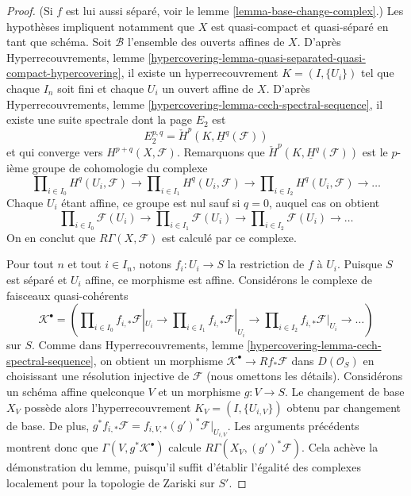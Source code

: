 \begin{proof}
(Si $f$ est lui aussi séparé, voir le
lemme \ref{lemma-base-change-complex}.)
Les hypothèses impliquent notamment que $X$
est quasi-compact et quasi-séparé en tant que schéma.
Soit $\mathcal{B}$ l'ensemble des ouverts affines de $X$. D'après
Hyperrecouvrements,
lemme \ref{hypercovering-lemma-quasi-separated-quasi-compact-hypercovering},
il existe un hyperrecouvrement $K = (I, \{U_i\})$ tel que chaque
$I_n$ soit fini et chaque $U_i$ un ouvert affine de $X$. D'après
Hyperrecouvrements, lemme \ref{hypercovering-lemma-cech-spectral-sequence},
il existe une suite spectrale dont la page $E_2$ est
$$
E_2^{p, q} = \check{H}^p(K, \underline{H}^q(\mathcal{F}))
$$
et qui converge vers $H^{p + q}(X, \mathcal{F})$. Remarquons que
$\check{H}^p(K, \underline{H}^q(\mathcal{F}))$ est le $p$-ième groupe
de cohomologie du complexe
$$
\prod\nolimits_{i \in I_0} H^q(U_i, \mathcal{F})
\to
\prod\nolimits_{i \in I_1} H^q(U_i, \mathcal{F})
\to
\prod\nolimits_{i \in I_2} H^q(U_i, \mathcal{F})
\to \ldots
$$
Chaque $U_i$ étant affine, ce groupe est nul sauf si $q = 0$,
auquel cas on obtient
$$
\prod\nolimits_{i \in I_0} \mathcal{F}(U_i)
\to
\prod\nolimits_{i \in I_1} \mathcal{F}(U_i)
\to
\prod\nolimits_{i \in I_2} \mathcal{F}(U_i)
\to \ldots
$$
On en conclut que $R\Gamma(X, \mathcal{F})$ est calculé par
ce complexe.

\medskip\noindent
Pour tout $n$ et tout $i \in I_n$, notons $f_i : U_i \to S$ la restriction de
$f$ à $U_i$. Puisque $S$ est séparé et $U_i$ affine, ce morphisme est
affine. Considérons le complexe de faisceaux quasi-cohérents
$$
\mathcal{K}^\bullet = (
\prod\nolimits_{i \in I_0} f_{i, *}\mathcal{F}|_{U_i}
\to
\prod\nolimits_{i \in I_1} f_{i, *}\mathcal{F}|_{U_i}
\to
\prod\nolimits_{i \in I_2} f_{i, *}\mathcal{F}|_{U_i}
\to \ldots )
$$
sur $S$. Comme dans
Hyperrecouvrements, lemme \ref{hypercovering-lemma-cech-spectral-sequence},
on obtient un morphisme $\mathcal{K}^\bullet \to Rf_*\mathcal{F}$ dans
$D(\mathcal{O}_S)$ en choisissant une résolution injective de $\mathcal{F}$
(nous omettons les détails). Considérons un schéma affine quelconque $V$ et un morphisme
$g : V \to S$. Le changement de base $X_V$ possède alors l'hyperrecouvrement
$K_V = (I, \{U_{i, V}\})$ obtenu par changement de base. De plus,
$g^*f_{i, *}\mathcal{F} = f_{i, V, *}(g')^*\mathcal{F}|_{U_{i, V}}$.
Les arguments précédents montrent donc que $\Gamma(V, g^*\mathcal{K}^\bullet)$
calcule $R\Gamma(X_V, (g')^*\mathcal{F})$.
Cela achève la démonstration du lemme, puisqu'il suffit d'établir l'égalité des complexes
localement pour la topologie de Zariski sur $S'$.
\end{proof}


